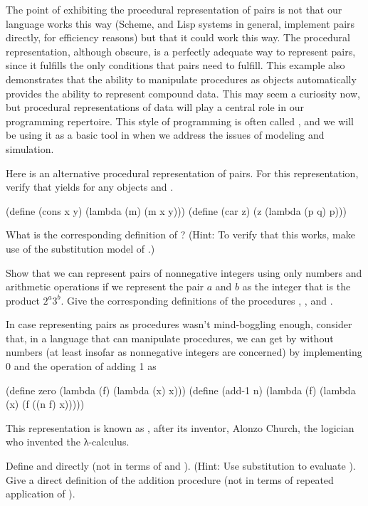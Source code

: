 The point of exhibiting the procedural representation of pairs is not that our
language works this way (Scheme, and Lisp systems in general, implement pairs
directly, for efficiency reasons) but that it could work this way.  The
procedural representation, although obscure, is a perfectly adequate way to
represent pairs, since it fulfills the only conditions that pairs need to
fulfill.  This example also demonstrates that the ability to manipulate
procedures as objects automatically provides the ability to represent compound
data.  This may seem a curiosity now, but procedural representations of data
will play a central role in our programming repertoire.  This style of
programming is often called , and we will be using it
as a basic tool in  when we address the issues of modeling and
simulation.

\begin{exerciseGroup}
\label{Exercise 2.4}
 Here is an alternative procedural
representation of pairs.  For this representation, verify that  yields  for any objects  and .

\begin{codeBlock}
(define (cons x y)
  (lambda (m) (m x y)))
(define (car z)
  (z (lambda (p q) p)))
\end{codeBlock}

What is the corresponding definition of ? (Hint: To verify that this
works, make use of the substitution model of .)

\label{Exercise 2.5}
 Show that we can represent pairs of
nonnegative integers using only numbers and arithmetic operations if we
represent the pair \( a \) and \( b \) as the integer that is the product \( 2^a 3^b \).
Give the corresponding definitions of the procedures ,
, and .

\label{Exercise 2.6}
 In case representing pairs as
procedures wasn't mind-boggling enough, consider that, in a language that can
manipulate procedures, we can get by without numbers (at least insofar as
nonnegative integers are concerned) by implementing 0 and the operation of
adding 1 as

\begin{codeBlock}
(define zero (lambda (f) (lambda (x) x)))
(define (add-1 n)
  (lambda (f) (lambda (x) (f ((n f) x)))))
\end{codeBlock}

This representation is known as , after its inventor,
Alonzo Church, the logician who invented the λ-calculus.

Define  and  directly (not in terms of  and
).  (Hint: Use substitution to evaluate ).  Give
a direct definition of the addition procedure \code{+} (not in terms of
repeated application of ).
\end{exerciseGroup}

